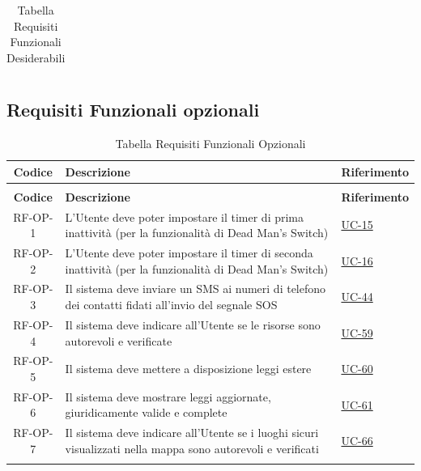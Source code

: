 \documentclass[a4paper,12pt]{article}
\begin{document}
\begin{center}
\begin{longtable}{|c|p{8.5cm}|>{\centering\arraybackslash}p{4cm}|}
\caption{Tabella Requisiti Funzionali Desiderabili} \label{tab:requisiti_funzionali_desiderabili} \\
\end{longtable}
\end{center}



\subsection{Requisiti Funzionali opzionali} \label{subsection:requisiti_funzionali_opzionali}
\begin{center}
\renewcommand{\arraystretch}{1.5}
\begin{longtable}{|c|p{8.5cm}|>{\centering\arraybackslash}p{4cm}|}

\hline
\rowcolor{gray!60}
\textbf{Codice} & \textbf{Descrizione} & \textbf{Riferimento} \\
\hline
\endfirsthead
\caption[]{Tabella Requisiti Funzionali opzionali (continua)} \\
\hline
\rowcolor{gray!60}
\textbf{Codice} & \textbf{Descrizione} & \textbf{Riferimento} \\
\hline
\endhead

\rowcolor{gray!20}
RF-OP-1 & L'Utente deve poter impostare il timer di prima inattività (per la funzionalità di Dead Man's Switch) & \hyperref[sec:UC-15]{UC-15} \\
\hline
\rowcolor{white}
RF-OP-2 & L'Utente deve poter impostare il timer di seconda inattività (per la funzionalità di Dead Man's Switch) & \hyperref[sec:UC-16]{UC-16} \\
\hline
\rowcolor{gray!20}
RF-OP-3 & Il sistema deve inviare un SMS ai numeri di telefono dei contatti fidati all'invio del segnale SOS & \hyperref[sec:UC-44]{UC-44} \\
\hline
\rowcolor{white}
RF-OP-4 & Il sistema deve indicare all'Utente se le risorse sono autorevoli e verificate & \hyperref[sec:UC-59]{UC-59} \\
\hline
\rowcolor{gray!20}
RF-OP-5 & Il sistema deve mettere a disposizione leggi estere & \hyperref[sec:UC-60]{UC-60} \\
\hline
\rowcolor{white}
RF-OP-6 & Il sistema deve mostrare leggi aggiornate, giuridicamente valide e complete & \hyperref[sec:UC-61]{UC-61} \\
\hline
\rowcolor{gray!20}
RF-OP-7 & Il sistema deve indicare all'Utente se i luoghi sicuri visualizzati nella mappa sono autorevoli e verificati & \hyperref[sec:UC-66]{UC-66} \\
\hline

\caption{Tabella Requisiti Funzionali Opzionali} \label{tab:requisiti_funzionali_opzionali} \\
\end{longtable}
\end{center}
\end{document}
